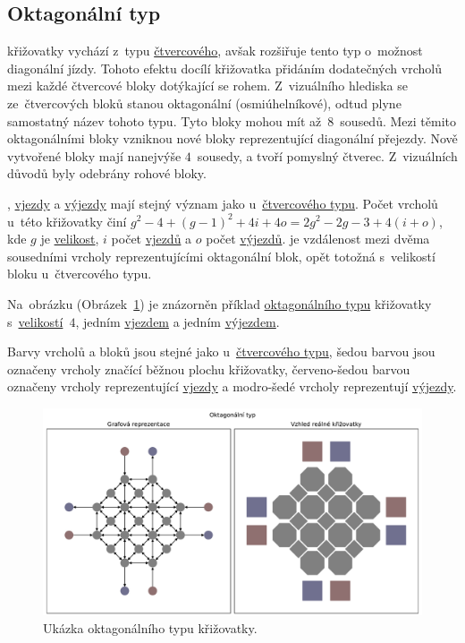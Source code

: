 \subsection{Oktagonální typ}\label{subsec:oktagonalni_typ}

 křižovatky vychází z~typu \hyperref[subsec:ctvercovy_typ]{čtvercového},
avšak rozšiřuje tento typ o~možnost diagonální jízdy.
Tohoto efektu docílí křižovatka přidáním dodatečných vrcholů mezi každé čtvercové bloky dotýkající se rohem.
Z~vizuálního hlediska se ze~čtvercových bloků stanou oktagonální (osmiúhelníkové),
odtud plyne samostatný název tohoto typu.
Tyto bloky mohou mít až~$8$~sousedů.
Mezi těmito oktagonálními bloky vzniknou nové bloky reprezentující diagonální přejezdy.
Nově vytvořené bloky mají nanejvýše $4$~sousedy, a tvoří pomyslný čtverec.
Z~vizuálních důvodů byly odebrány rohové bloky.

, \hyperref[par:vjezdy]{vjezdy} a \hyperref[par:vyjezdy]{výjezdy}
mají stejný význam jako u~\hyperref[subsec:ctvercovy_typ]{čtvercového typu}.
Počet vrcholů u~této křižovatky činí $g^2 - 4 + (g-1)^2 + 4i + 4o = 2g^2 - 2g - 3 + 4(i + o)$,
kde $g$ je \hyperref[par:velikost_krizovatky]{velikost},
$i$ počet \hyperref[par:vjezdy]{vjezdů} a $o$ počet \hyperref[par:vyjezdy]{výjezdů}.
 je vzdálenost mezi dvěma sousedními vrcholy reprezentujícími oktagonální blok,
opět totožná s~velikostí bloku u~čtvercového typu.

Na~obrázku (Obrázek~\ref{fig:octagonal_type_graph}) je znázorněn příklad
\hyperref[subsec:oktagonali_typ]{oktagonálního typu} křižovatky s~\hyperref[par:velikost_krizovatky]{velikostí}~$4$,
jedním \hyperref[par:vjezdy]{vjezdem} a jedním \hyperref[par:vyjezdy]{výjezdem}.

Barvy vrcholů a bloků jsou stejné jako u~\hyperref[subsec:ctvercovy_typ]{čtvercového typu},
šedou barvou jsou označeny vrcholy značící běžnou plochu křižovatky,
červeno-šedou barvou označeny vrcholy reprezentující \hyperref[par:vjezdy]{vjezdy} a
modro-šedé vrcholy reprezentují \hyperref[par:vyjezdy]{výjezdy}.

\begin{figure}[h]
	\centering
	\includegraphics[width=\textwidth]{../img/Octagonal_grid}
	\caption{Ukázka oktagonálního typu křižovatky.}
	\label{fig:octagonal_type_graph}
\end{figure}

